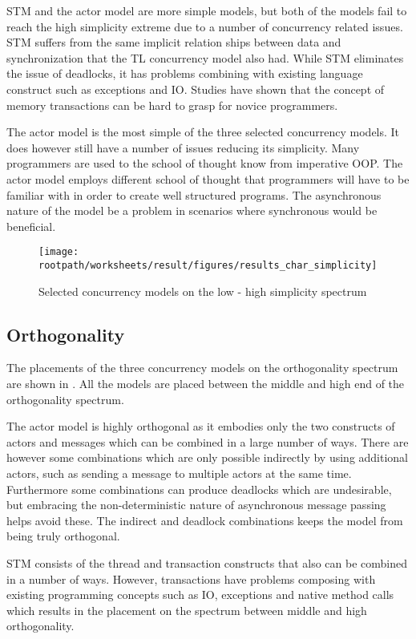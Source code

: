 \ac{STM} and the actor model are more simple models, but both of the models fail to reach the high simplicity extreme due to a number of concurrency related issues. \ac{STM} suffers from the same implicit relation ships between data and synchronization that the \ac{TL} concurrency model also had. While \ac{STM} eliminates the issue of deadlocks, it has problems combining with existing language construct such as exceptions and \ac{IO}. Studies have shown that the concept of memory transactions can be hard to grasp for novice programmers.

The actor model is the most simple of the three selected concurrency models. It does however still have a number of issues reducing its simplicity. Many programmers are used to the school of thought know from imperative \ac{OOP}. The actor model employs different school of thought that programmers will have to be familiar with in order to create well structured programs. The asynchronous nature of the model be a problem in scenarios where synchronous would be beneficial.

\begin{figure}[htbp]
\centering
 \texttt{[image: \\rootpath/worksheets/result/figures/results\_char\_simplicity]} 
 \caption{Selected concurrency models on the low - high simplicity spectrum}
\label{fig:results_char_simplicity}
\end{figure}

\subsection{Orthogonality}
The placements of the three concurrency models on the orthogonality spectrum are shown in . All the models are placed between the middle and high end of the orthogonality spectrum.

The actor model is highly orthogonal as it embodies only the two constructs of actors and messages which can be combined in a large number of ways. There are however some combinations which are only possible indirectly by using additional actors, such as sending a message to multiple actors at the same time. Furthermore some combinations can produce deadlocks which are undesirable, but embracing the non-deterministic nature of asynchronous message passing helps avoid these. The indirect and deadlock combinations keeps the model from being truly orthogonal.

\ac{STM} consists of the thread and transaction constructs that also can be combined in a number of ways. However, transactions have problems
composing with existing programming concepts such as IO, exceptions and
native method calls which results in the placement on the spectrum between middle and high orthogonality.

